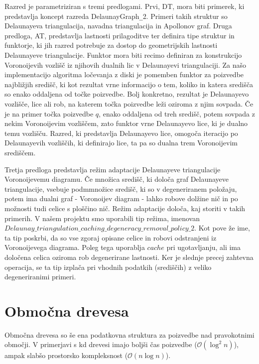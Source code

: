 \documentclass[a4paper, 12pt]{book}
\newcommand{\OO}{\ensuremath{\mathcal{O}}} %
\begin{document}
Razred je parametriziran s tremi predlogami. Prvi, DT, mora biti primerek, ki predstavlja koncept razreda DelaunayGraph\texttt{\_}2. Primeri takih struktur so Delaunayeva triangulacija, navadna triangulacija in Apollonov graf. Druga predloga, AT, predstavlja lastnosti prilagoditve ter definira tipe struktur in funktorje, ki jih razred potrebuje za dostop do geometrijskih lastnosti Delaunayeve triangulacije. Funktor mora biti recimo definiran za konstrukcijo Voronoijevih vozlišč iz njihovih dualnih lic v Delaunayevi triangulaciji. Za našo implementacijo algoritma ločevanja z diski je pomemben funktor za poizvedbe najbližjih središč, ki kot rezultat vrne informacijo o tem, koliko in katera središča so enako oddaljena od točke poizvedbe. Bolj konkretno, rezultat je Delaunayevo vozlišče, lice ali rob, na katerem točka poizvedbe leži oziroma z njim sovpada. Če je na primer točka poizvedbe $q$, enako oddaljena od treh središč, potem sovpada z nekim Voronoijevim vozliščem, zato funktor vrne Delaunayevo lice, ki je dualno temu vozlišču. Razred, ki predstavlja Delaunayevo lice, omogoča iteracijo po Delaunayevih vozliščih, ki definirajo lice, ta pa so dualna trem Voronoijevim središčem.

Tretja predloga predstavlja režim adaptacije Delaunayeve triangulacije Voronoijevemu diagramu. 
Če množica središč, ki določa graf Delaunayeve triangulacije, vsebuje podmmnožice središč, ki so v degeneriranem položaju, potem ima dualni graf - Voronoijev diagram - lahko robove dolžine nič in po možnosti tudi celice s ploščino nič. Režim adaptacije določa, kaj storiti v takih primerih. V našem projektu smo uporabili tip režima, imenovan $Delaunay\texttt{\_}triangulation\texttt{\_}caching\texttt{\_}degeneracy\texttt{\_}removal\texttt{\_}policy\texttt{\_}2$. Kot pove že ime, ta tip poskrbi, da so vse zgoraj opisane celice in robovi odstranjeni iz Voronoijevega diagrama. Poleg tega uporablja $cache$ pri ugotavljanju, ali ima določena celica oziroma rob degenerirane lastnosti. Ker je slednje precej zahtevna operacija, se ta tip izplača pri vhodnih podatkih (središčih) z veliko degeneriranimi primeri.
 

\section{Območna drevesa}
Območna drevesa so še ena podatkovna struktura za poizvedbe nad pravokotnimi območji. V primerjavi s kd drevesi imajo boljši čas poizvedbe ($\OO(\log^2 n)$), ampak slabšo prostorsko kompleksnost ($\OO(n\log n)$).
\end{document}
